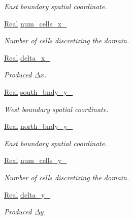 \begin{DoxyCompactItemize}
\begin{DoxyCompactList}\small\item\em East boundary spatial coordinate. \end{DoxyCompactList}\item 
\hyperlink{group__c01-roots_gac080bbbf5cbb5502c9f00405f894857d}{Real} \hyperlink{classmtk_1_1UniStgGrid2D_ab2ba026208a175c150e3f4fd3bed3f20}{num\-\_\-cells\-\_\-x\-\_\-}
\begin{DoxyCompactList}\small\item\em Number of cells discretizing the domain. \end{DoxyCompactList}\item 
\hyperlink{group__c01-roots_gac080bbbf5cbb5502c9f00405f894857d}{Real} \hyperlink{classmtk_1_1UniStgGrid2D_ab1fbb3cf685c51f434488e378564bd2a}{delta\-\_\-x\-\_\-}
\begin{DoxyCompactList}\small\item\em Produced $ \Delta x$. \end{DoxyCompactList}\item 
\hyperlink{group__c01-roots_gac080bbbf5cbb5502c9f00405f894857d}{Real} \hyperlink{classmtk_1_1UniStgGrid2D_aa36037d53f3d00433f5eaa0a05b712bc}{south\-\_\-bndy\-\_\-y\-\_\-}
\begin{DoxyCompactList}\small\item\em West boundary spatial coordinate. \end{DoxyCompactList}\item 
\hyperlink{group__c01-roots_gac080bbbf5cbb5502c9f00405f894857d}{Real} \hyperlink{classmtk_1_1UniStgGrid2D_aef711eec2a4382a2f8e094f0bec6b879}{north\-\_\-bndy\-\_\-y\-\_\-}
\begin{DoxyCompactList}\small\item\em East boundary spatial coordinate. \end{DoxyCompactList}\item 
\hyperlink{group__c01-roots_gac080bbbf5cbb5502c9f00405f894857d}{Real} \hyperlink{classmtk_1_1UniStgGrid2D_ab6532883e1a10a0113f3a7681e53612c}{num\-\_\-cells\-\_\-y\-\_\-}
\begin{DoxyCompactList}\small\item\em Number of cells discretizing the domain. \end{DoxyCompactList}\item 
\hyperlink{group__c01-roots_gac080bbbf5cbb5502c9f00405f894857d}{Real} \hyperlink{classmtk_1_1UniStgGrid2D_ace5af3c991f241a895318b9761db73eb}{delta\-\_\-y\-\_\-}
\begin{DoxyCompactList}\small\item\em Produced $ \Delta y$. \end{DoxyCompactList}\end{DoxyCompactItemize}
